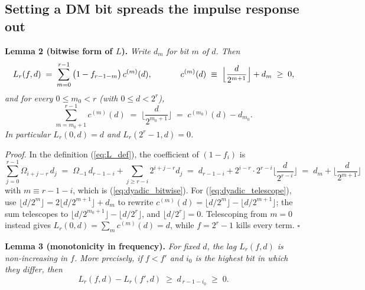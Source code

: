 \documentclass{article}
\numberwithin{equation}{section}   %
\begin{document}
\subsection{Setting a DM bit spreads the impulse response out}
\label{ssec:dyadic_lag}

\par\noindent
{\bf Lemma 2 (bitwise form of $L$).}
{\em Write $d_m$ for bit $m$ of $d$. Then}
\begin{equation}
L_r(f,d) \;=\; \sum_{m=0}^{r-1} \big( 1 - f_{r-1-m} \big) \, c^{(m)}(d),
  \hspace{1.2cm}
c^{(m)}(d) \;\equiv\; \Big\lfloor \frac{d}{2^{m+1}} \Big\rfloor + d_m \;\ge\; 0,
\label{eq:dyadic_bitwise}
\end{equation}
{\em and for every $0 \le m_0 < r$ (with $0 \le d < 2^r$),}
\begin{equation}
\sum_{m=m_0+1}^{r-1} c^{(m)}(d) \;=\; \Big\lfloor \frac{d}{2^{m_0+1}} \Big\rfloor
  \;=\; c^{(m_0)}(d) - d_{m_0}.
\label{eq:dyadic_telescope}
\end{equation}
{\em In particular $L_r(0,d) = d$ and $L_r(2^r-1,d) = 0$.}

\medskip
\par\noindent
{\em Proof.} In the definition (\ref{eq:L_def}), the coefficient of $(1-f_i)$ is
\begin{equation}
\sum_{j=0}^{r-1} \Omega_{i+j-r} \, d_j
 \;=\; \Omega_{-1} \, d_{r-1-i} + \sum_{j \ge r-i} 2^{i+j-r} d_j
 \;=\; d_{r-1-i} + 2^{i-r} \cdot 2^{r-i} \Big\lfloor \frac{d}{2^{r-i}} \Big\rfloor
 \;=\; d_m + \Big\lfloor \frac{d}{2^{m+1}} \Big\rfloor
\end{equation}
with $m \equiv r-1-i$, which is (\ref{eq:dyadic_bitwise}). For
(\ref{eq:dyadic_telescope}), use $\lfloor d/2^m \rfloor = 2 \lfloor d/2^{m+1} \rfloor + d_m$
to rewrite $c^{(m)}(d) = \lfloor d/2^m \rfloor - \lfloor d/2^{m+1} \rfloor$; the sum
telescopes to $\lfloor d/2^{m_0+1} \rfloor - \lfloor d/2^r \rfloor$, and
$\lfloor d/2^r \rfloor = 0$. Telescoping from $m=0$ instead gives
$L_r(0,d) = \sum_m c^{(m)}(d) = d$, while $f = 2^r-1$ kills every term. $\square$

\medskip
\par\noindent
{\bf Lemma 3 (monotonicity in frequency).}
{\em For fixed $d$, the lag $L_r(f,d)$ is non-increasing in $f$. More precisely, if $f<f'$
and $i_0$ is the highest bit in which they differ, then}
\begin{equation}
L_r(f,d) - L_r(f',d) \;\ge\; d_{\,r-1-i_0} \;\ge\; 0.
\label{eq:dyadic_monotone}
\end{equation}
\end{document}
